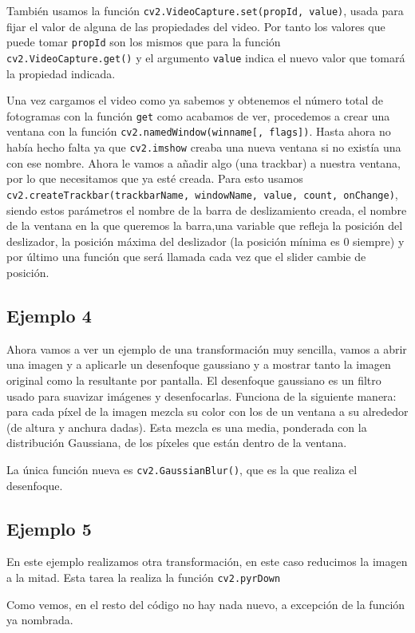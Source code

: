\documentclass[a4paper,openright, 12pt]{book}
\begin{document}
También usamos la función \lstinline|cv2.VideoCapture.set(propId, value)|, usada para fijar el valor de alguna de las propiedades del video. Por tanto los valores que puede tomar \lstinline|propId| son los mismos que para la función \lstinline|cv2.VideoCapture.get()| y el argumento \lstinline|value| indica el nuevo valor que tomará la propiedad indicada.

Una vez cargamos el video como ya sabemos y obtenemos el número total de fotogramas con la función \lstinline|get| como acabamos de ver, procedemos a crear una ventana con la función \lstinline|cv2.namedWindow(winname[, flags])|.
Hasta ahora no había hecho falta ya que \lstinline|cv2.imshow| creaba una nueva ventana si no existía una con ese nombre.
Ahora le vamos a añadir algo (una trackbar) a nuestra ventana, por lo que necesitamos que ya esté creada.
Para esto usamos \lstinline|cv2.createTrackbar(trackbarName, windowName, value, count, onChange)|, siendo estos parámetros el nombre de la barra de deslizamiento creada, el nombre de la ventana en la que queremos la barra,una variable que refleja la posición del deslizador, la posición máxima del deslizador (la posición mínima es 0 siempre) y por último una función que será llamada cada vez que el slider cambie de posición.

\newpage

\subsection*{Ejemplo 4}
Ahora vamos a ver un ejemplo de una transformación muy sencilla, vamos a abrir una imagen y a aplicarle un desenfoque gaussiano y a mostrar tanto la imagen original como la resultante por pantalla. El desenfoque gaussiano es un filtro usado para suavizar imágenes y desenfocarlas. Funciona de la siguiente manera: para cada píxel de la imagen mezcla su color con los de un ventana a su alrededor (de altura y anchura dadas). Esta mezcla es una media, ponderada con la distribución Gaussiana, de los píxeles que están dentro de la ventana.

La única función nueva es 
\lstinline|cv2.GaussianBlur()|, que es la que realiza el desenfoque.




\newpage

\subsection*{Ejemplo 5}
En este ejemplo realizamos otra transformación, en este caso reducimos la imagen a la mitad. Esta tarea la realiza la función \lstinline|cv2.pyrDown|

Como vemos, en el resto del código no hay nada nuevo, a excepción de la función ya nombrada.
\newpage
\end{document}
